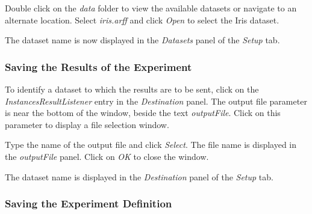 Double click on the \textit{data} folder to view the available datasets or navigate to an alternate location. Select \textit{iris.arff} and click \textit{Open} to select the Iris dataset.
\begin{center}
\end{center}
	
\begin{center}
\end{center}

The dataset name is now displayed in the \textit{Datasets} panel of the \textit{Setup} tab.



\subsubsection*{Saving the Results of the Experiment}

To identify a dataset to which the results are to be sent, click on the \textit{InstancesResultListener} entry in the \textit{Destination} panel. The output file parameter is near the bottom of the window, beside the text \textit{outputFile}. Click on this parameter to display a file selection window.
\begin{center}
\end{center}
	
\begin{center}
\end{center}

Type the name of the output file and click \textit{Select}. The file name is displayed in the \textit{outputFile} panel. Click on \textit{OK} to close the window.
\begin{center}
\end{center}

The dataset name is displayed in the \textit{Destination} panel of the \textit{Setup} tab.
\begin{center}
\end{center}



\subsubsection*{Saving the Experiment Definition}

